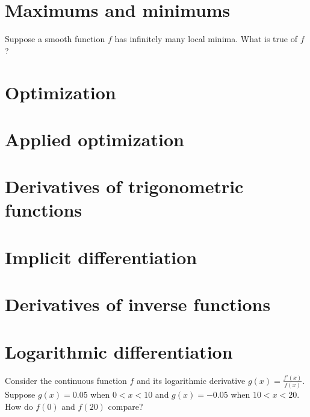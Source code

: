 \documentclass{ximera}
\begin{document}
\section{Maximums and minimums}

\begin{problem}
  Suppose a smooth function $f$ has infinitely many local minima.  What is true of $f$?
  \begin{multipleChoice}
  \end{multipleChoice}
\end{problem}

\section{Optimization}
\section{Applied optimization}
\section{Derivatives of trigonometric functions}
\section{Implicit differentiation}
\section{Derivatives of inverse functions}
\section{Logarithmic differentiation}

\begin{problem}
  Consider the continuous function $f$ and its logarithmic derivative $g(x) = \frac{f'(x)}{f(x)}$.  Suppose $g(x) = 0.05$ when $0 < x < 10$ and $g(x) = -0.05$ when $10 < x < 20$.  How do $f(0)$ and $f(20)$ compare?
  \begin{multipleChoice}
  \end{multipleChoice}
\end{problem}
\end{document}
